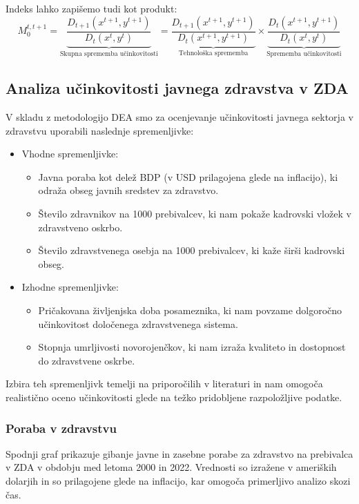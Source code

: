 \documentclass[12pt,a4paper]{article}
\theoremstyle{definition}
\begin{document}
Indeks lahko zapišemo tudi kot produkt:
\[
M_0^{t,t+1} = \underbrace{\frac{D_{t+1}(x^{t+1}, y^{t+1})}{D_t(x^t, y^t)}}_{\text{Skupna sprememba učinkovitosti}}
= \underbrace{\frac{D_{t+1}(x^{t+1}, y^{t+1})}{D_t(x^{t+1}, y^{t+1})}}_{\text{Tehnološka sprememba}}
\times
\underbrace{\frac{D_t(x^{t+1}, y^{t+1})}{D_t(x^t, y^t)}}_{\text{Sprememba učinkovitosti}}
\]

\subsection{Analiza učinkovitosti javnega zdravstva v ZDA}

V skladu z metodologijo DEA smo za ocenjevanje učinkovitosti javnega sektorja v zdravstvu uporabili naslednje spremenljivke:

\begin{itemize}
\item Vhodne spremenljivke:
    \begin{itemize}
        \item Javna poraba kot delež BDP (v USD prilagojena glede na inflacijo), ki odraža obseg javnih sredstev za zdravstvo.
        \item Število zdravnikov na 1000 prebivalcev, ki nam pokaže kadrovski vložek v zdravstveno oskrbo.
        \item Število zdravstvenega osebja na 1000 prebivalcev, ki kaže širši kadrovski obseg.
    \end{itemize}
\item Izhodne spremenljivke:
    \begin{itemize}
        \item Pričakovana življenjska doba posameznika, ki nam povzame dolgoročno učinkovitost določenega zdravstvenega sistema.
        \item Stopnja umrljivosti novorojenčkov, ki nam izraža kvaliteto in dostopnost do zdravstvene oskrbe.
    \end{itemize}
\end{itemize}

Izbira teh spremenljivk temelji na priporočilih v literaturi \cite{Yaisawarng2002} in nam omogoča realistično oceno učinkovitosti glede na težko pridobljene razpoložljive podatke.

\subsubsection{Poraba v zdravstvu}

Spodnji graf prikazuje gibanje javne in zasebne porabe za zdravstvo na prebivalca v ZDA v obdobju med letoma 2000 in 2022. 
Vrednosti so izražene v ameriških dolarjih in so prilagojene glede na inflacijo, kar omogoča primerljivo analizo skozi čas.
\end{document}
